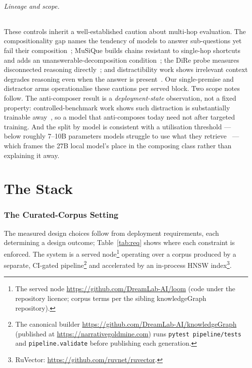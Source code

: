 \documentclass[10pt,twocolumn]{article}
\begin{document}
\paragraph{Lineage and scope.} These controls inherit a well-established caution about multi-hop evaluation. The compositionality gap names the tendency of models to answer sub-questions yet fail their composition~\cite{press2023compgap}; MuSiQue builds chains resistant to single-hop shortcuts and adds an unanswerable-decomposition condition~\cite{musique2022}; the DiRe probe measures disconnected reasoning directly~\cite{dire2020}; and distractibility work shows irrelevant context degrades reasoning even when the answer is present~\cite{shi2023distracted,faithfate2023}. Our single-premise and distractor arms operationalise these cautions per served block. Two scope notes follow. The anti-composer result is a \emph{deployment-state} observation, not a fixed property: controlled-benchmark work shows such distraction is substantially trainable away~\cite{gsmdc2025}, so a model that anti-composes today need not after targeted training. And the split by model is consistent with a utilisation threshold --- below roughly 7--10B parameters models struggle to use what they retrieve~\cite{retrievalutil2026} --- which frames the 27B local model's place in the composing class rather than explaining it away.





\part{The Stack}

\section{The Curated-Corpus Setting}\label{sec:setting}
The measured design choices follow from deployment requirements, each determining a design outcome; Table~\ref{tab:req} shows where each constraint is enforced. The system is a served node\footnote{The served node \url{https://github.com/DreamLab-AI/loom} (code under the repository licence; corpus terms per the sibling knowledgeGraph repository).} operating over a corpus produced by a separate, CI-gated pipeline\footnote{The canonical builder \url{https://github.com/DreamLab-AI/knowledgeGraph} (published at \url{https://narrativegoldmine.com}) runs \texttt{pytest pipeline/tests} and \texttt{pipeline.validate} before publishing each generation.} and accelerated by an in-process HNSW index\footnote{RuVector: \url{https://github.com/ruvnet/ruvector}.}.
\end{document}
